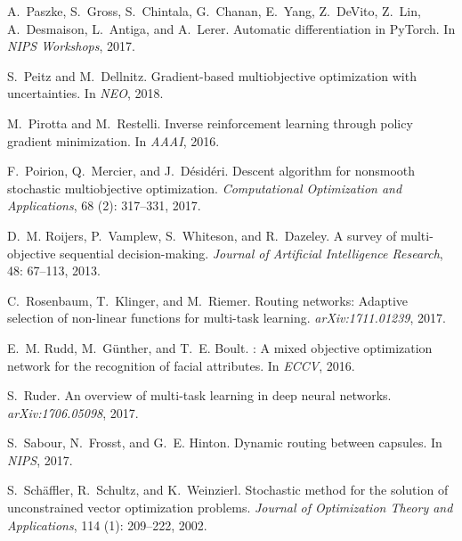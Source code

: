 \documentclass{article}
\begin{document}
{\begin{thebibliography}{60}
A.~Paszke, S.~Gross, S.~Chintala, G.~Chanan, E.~Yang, Z.~DeVito, Z.~Lin,
  A.~Desmaison, L.~Antiga, and A.~Lerer.
\newblock Automatic differentiation in {PyTorch}.
\newblock In \emph{NIPS Workshops}, 2017.

S.~Peitz and M.~Dellnitz.
\newblock Gradient-based multiobjective optimization with uncertainties.
\newblock In \emph{NEO}, 2018.

M.~Pirotta and M.~Restelli.
\newblock Inverse reinforcement learning through policy gradient minimization.
\newblock In \emph{AAAI}, 2016.

F.~Poirion, Q.~Mercier, and J.~D{\'{e}}sid{\'{e}}ri.
\newblock Descent algorithm for nonsmooth stochastic multiobjective
  optimization.
\newblock \emph{Computational Optimization and Applications}, 68
  (2): 317--331, 2017.

D.~M. Roijers, P.~Vamplew, S.~Whiteson, and R.~Dazeley.
\newblock A survey of multi-objective sequential decision-making.
\newblock \emph{Journal of Artificial Intelligence Research}, 48:
  67--113, 2013.

C.~Rosenbaum, T.~Klinger, and M.~Riemer.
\newblock Routing networks: Adaptive selection of non-linear functions for
  multi-task learning.
\newblock \emph{arXiv:1711.01239}, 2017.

E.~M. Rudd, M.~G{\"u}nther, and T.~E. Boult.
: A mixed objective optimization network for the recognition of
  facial attributes.
\newblock In \emph{ECCV}, 2016.

S.~Ruder.
\newblock An overview of multi-task learning in deep neural networks.
\newblock \emph{arXiv:1706.05098}, 2017.

S.~Sabour, N.~Frosst, and G.~E. Hinton.
\newblock Dynamic routing between capsules.
\newblock In \emph{{NIPS}}, 2017.

S.~Sch{\"a}ffler, R.~Schultz, and K.~Weinzierl.
\newblock Stochastic method for the solution of unconstrained vector
  optimization problems.
\newblock \emph{Journal of Optimization Theory and Applications}, 114
  (1): 209--222, 2002.


\end{thebibliography}}
\end{document}
